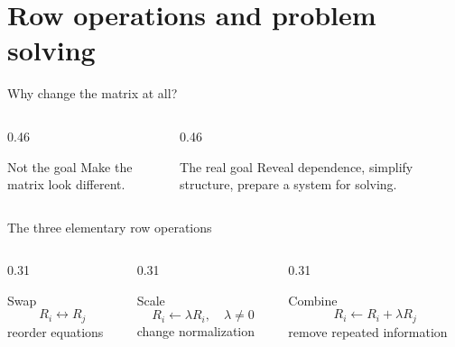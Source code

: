 \def\sectiontag{Transform the representation to reveal hidden relations}
\section{Row operations and problem solving}

\begin{frame}{Why change the matrix at all?}
  \begin{columns}[T,onlytextwidth]
    \begin{column}{0.46\textwidth}
      \begin{block}{Not the goal}
        Make the matrix look different.
      \end{block}
    \end{column}
    \begin{column}{0.46\textwidth}
      \begin{exampleblock}{The real goal}
        Reveal dependence, simplify structure, prepare a system for solving.
      \end{exampleblock}
    \end{column}
  \end{columns}

  \vspace{0.8cm}
\end{frame}

\begin{frame}{The three elementary row operations}
  \begin{columns}[T,onlytextwidth]
    \begin{column}{0.31\textwidth}
      \begin{block}{Swap}
        \[
        R_i\leftrightarrow R_j
        \]
        reorder equations
      \end{block}
    \end{column}
    \begin{column}{0.31\textwidth}
      \begin{exampleblock}{Scale}
        \[
        R_i\leftarrow\lambda R_i,
        \quad \lambda\neq0
        \]
        change normalization
      \end{exampleblock}
    \end{column}
    \begin{column}{0.31\textwidth}
      \begin{alertblock}{Combine}
        \[
        R_i\leftarrow R_i+\lambda R_j
        \]
        remove repeated information
      \end{alertblock}
    \end{column}
  \end{columns}
\end{frame}

